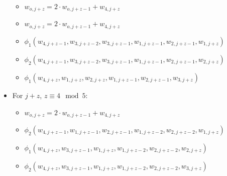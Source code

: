 \begin{itemize}
\begin{itemize}
		\item $w_{o, j + z} = 2 \cdot w_{o, j + z - 1} + w_{4, j + z}$
		\item $w_{o, j + z} = 2 \cdot w_{o, j + z - 1} + w_{4, j + z}$
		\item $\phi_1(w_{4, j + z - 1}, w_{3, j + z - 2}, w_{3, j + z - 1}, w_{1, j + z - 1}, w_{2, j + z - 1}, w_{1, j + z})$
		\item $\phi_2(w_{4, j + z - 1}, w_{3, j + z - 2}, w_{3, j + z - 1}, w_{1, j + z - 1}, w_{2, j + z - 1}, w_{2, j + z})$
		\item $\phi_1(w_{4, j + z }, w_{1, j + z }, w_{2, j + z }, w_{1, j + z - 1}, w_{2, j + z - 1}, w_{3, j + z})$
	\end{itemize}
	\item For $j + z$, $z \equiv 4 \mod 5$:
	\begin{itemize}
		\item $w_{o, j + z} = 2 \cdot w_{o, j + z - 1} + w_{4, j + z}$
		\item $\phi_2(w_{4, j + z - 1}, w_{1, j + z - 1}, w_{2, j + z - 1}, w_{1, j + z - 2}, w_{2, j + z - 2}, w_{1, j + z})$
		\item $\phi_1(w_{4, j + z }, w_{3, j + z - 1}, w_{1, j + z }, w_{1, j + z - 2}, w_{2, j + z - 2}, w_{2, j + z})$
		\item $\phi_2(w_{4, j + z }, w_{3, j + z - 1}, w_{1, j + z }, w_{1, j + z - 2}, w_{2, j + z - 2}, w_{3, j + z})$
	\end{itemize}
\end{itemize}
